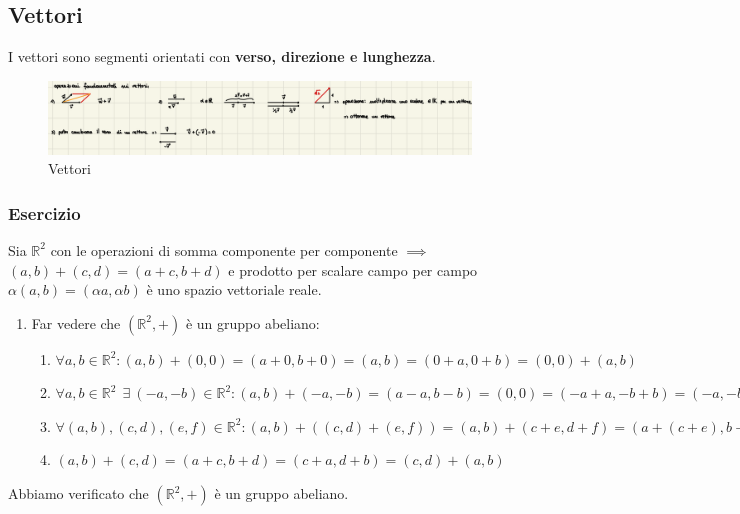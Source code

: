 \documentclass{article}
\begin{document}
\subsection{Vettori}
I vettori sono segmenti orientati con \textbf{verso, direzione e lunghezza}.
\begin{figure}[ht]
    \centering
    \includegraphics[width=1\linewidth]{image.png}
    \caption{Vettori}\label{fig:enter-label}
\end{figure}

\subsubsection{Esercizio}
Sia $\mathbb{R}^2$ con le operazioni di somma componente per componente
$\implies$ $(a, b) + (c, d) = (a+c, b+d)$ e prodotto per scalare campo per
campo $\alpha(a,b) = (\alpha a, \alpha b)$ è uno spazio vettoriale reale.

\begin{enumerate}
    \item Far vedere che $(\mathbb{R}^2,+)$ è un gruppo abeliano:
          \begin{enumerate}
              \item $\forall a,b \in \mathbb{R}^2 : (a,b)+(0,0) = (a+0, b+0) = (a,b) = (0+a, 0+b) = (0,0)+(a,b)$
              \item $\forall a,b \in \mathbb{R}^2 \ \ \exists \ (-a, -b) \in \mathbb{R}^2:(a,b)+(-a, -b) = (a-a, b-b) = (0,0) = (-a+a, -b+b) = (-a, -b)+(a,b)$
              \item  $\forall(a,b),(c,d),(e,f) \in \mathbb{R}^2 : (a,b)+ ((c,d)+(e,f)) = (a,b) + (c+e, d+f) = (a+ (c+e), b+ (d+f)) = ((a+c)+e, (b+d)+f) = (a+c, b+d)+(e,f)=((a,b)+(c,d))+(e,f)$
              \item  $(a,b)+(c,d)=(a+c, b+d)=(c+a,d+b)=(c,d)+(a,b)$
          \end{enumerate}
\end{enumerate}

Abbiamo verificato che $(\mathbb{R}^2,+)$ è un gruppo abeliano.
\end{document}
